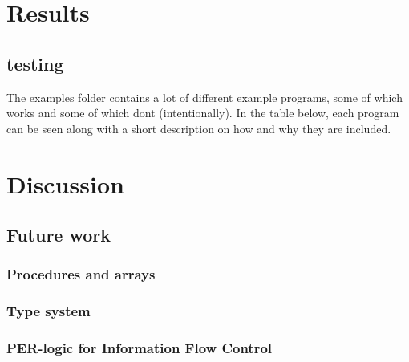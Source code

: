\section{Results}

\subsection{testing}
The examples folder contains a lot of different example programs, some of which works and some of which dont (intentionally). In the table below, each program can be seen along with a short description on how and why they are included.

\section{Discussion}

\subsection{Future work}

\subsubsection{Procedures and arrays}

\subsubsection{Type system}

\subsubsection{PER-logic for Information Flow Control}
